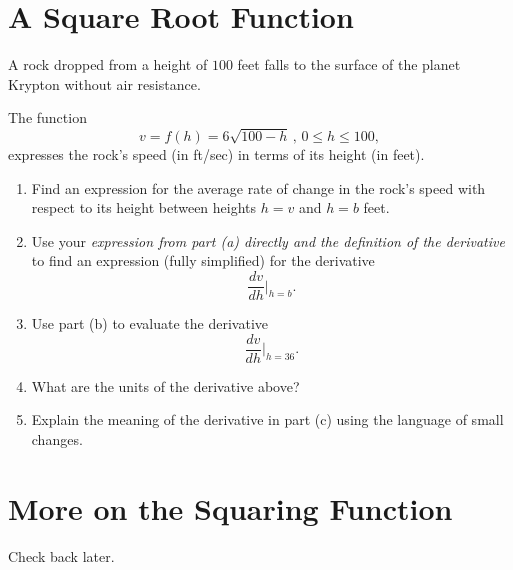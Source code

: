 \documentclass{ximera}
\begin{document}
\section{A Square Root Function}
\begin{question} \label{QLDFLDFDl3reffgbf} 
A rock dropped from a height of $100$ feet falls to the surface of the planet Krypton without air resistance.

The function
\[
   v = f(h) = 6\sqrt{100-h} \, , \, 0\leq h \leq 100,
\]
expresses the rock's speed (in ft/sec) in terms of its height (in feet).

\begin{enumerate}
\item Find an expression for the average rate of change in the rock's speed with respect to its height between heights  $h=v$ and $h=b$ feet.

\item Use your \emph{expression from part (a) directly and the definition of the derivative} to find an expression (fully simplified) for the derivative
\[
   \frac{dv}{dh}\Big|_{h=b} .
\]

\item Use part (b) to evaluate the derivative
\[
   \frac{dv}{dh}\Big|_{h=36} .
\]

\item What are the units of the derivative above?

\item Explain the meaning of the derivative in part (c) using the language of small changes.
\end{enumerate} 


\end{question}

\section{More on the Squaring Function}

Check back later.
\end{document}
